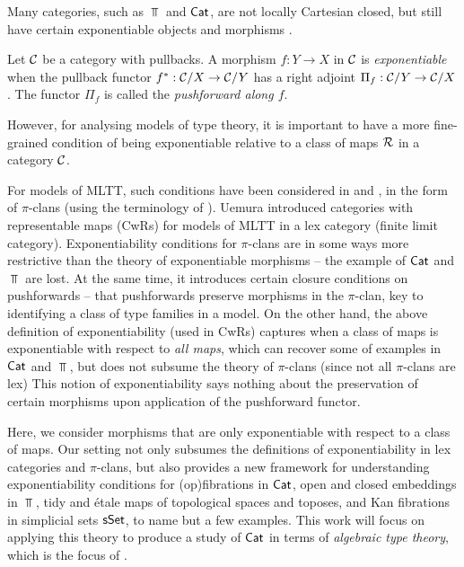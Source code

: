 Many categories, such as $\Top$ and $\mathsf{Cat}$,
are not locally Cartesian closed,
but still have certain exponentiable objects and morphisms
\cite{niefield1982, giraud1964}.
\begin{definition}\label{def:exp-map}
  Let $\mathcal{C}$ be a category with pullbacks.
  A morphism $f : Y \to X$ in $\mathcal{C}$ is \emph{exponentiable}
  when the pullback functor $f^* : \mathcal{C} / X \to \mathcal{C} / Y$
  has a right adjoint $\Pi_f : \mathcal{C} / Y \to \mathcal{C} / X$.
  The functor $\Pi_f$ is called the \emph{pushforward along $f$}.
\end{definition}
However, for analysing models of type theory,
it is important to have a more fine-grained condition of being exponentiable
relative to a class of maps $\mathcal{R}$ in a category $\mathcal{C}$.

For models of MLTT,
such conditions have been considered in \cite{taylor1987} and \cite{joyal2017},
in the form of $\pi$-clans (using the terminology of \cite{joyal2017}).
Uemura introduced categories with representable maps (CwRs) \cite{uemura2023}
for models of MLTT in a lex category (finite limit category).
Exponentiability conditions for $\pi$-clans are in some ways more restrictive than the
theory of exponentiable morphisms --
the example of $\mathsf{Cat}$ and $\Top$ are lost.
At the same time,
it introduces certain closure conditions on pushforwards --
that pushforwards preserve morphisms in the $\pi$-clan,
key to identifying a class of type families in a model.
On the other hand, the above definition of exponentiability (used in CwRs)
captures when a class of maps is exponentiable with respect to \emph{all maps},
which can recover some of examples in $\mathsf{Cat}$ and $\Top$,
but does not subsume the theory of $\pi$-clans
(since not all $\pi$-clans are lex)
This notion of exponentiability says nothing about the
preservation of certain morphisms upon application
of the pushforward functor.

Here, we consider morphisms that are only exponentiable with respect to
a class of maps.
Our setting not only subsumes the
definitions of exponentiability in lex categories and $\pi$-clans,
but also provides a new framework for understanding exponentiability conditions for (op)fibrations in $\mathsf{Cat}$,
open and closed embeddings in $\Top$,
tidy and \'etale maps of topological spaces and toposes,
and Kan fibrations in simplicial sets $\mathsf{sSet}$,
to name but a few examples.
This work will focus on applying this theory to
produce a study of $\mathsf{Cat}$ in terms of \emph{algebraic type theory},
which is the focus of .

